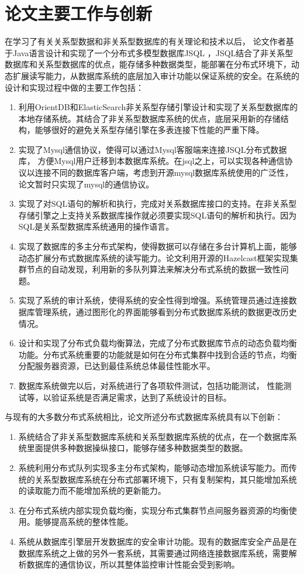 \section{论文主要工作与创新}
在学习了有关关系型数据和非关系型数据库的有关理论和技术以后，
论文作者基于Java语言设计和实现了一个分布式多模型数据库JSQL
，JSQL结合了非关系型数据库和关系型数据库的优点，能存储多种数据类型，能部署在分布式环境下，动态扩展读写能力，从数据库系统的底层加入审计功能以保证系统的安全。在系统的设计和实现过程中做的主要工作包括：
\begin{enumerate}[fullwidth,itemindent=2em]
	\item 利用OrientDB和ElasticSearch非关系型存储引擎设计和实现了关系型数据库的本地存储系统。其结合了非关系型数据库系统的优点，底层采用新的存储结构，能够很好的避免关系型存储引擎在多表连接下性能的严重下降。
	\item 实现了Mysql通信协议，使得可以通过Mysql客服端来连接JSQL分布式数据库，
	方便Mysql用户迁移到本数据库系统。在jsql之上，可以实现各种通信协议以连接不同的数据库客户端，考虑到开源mysql数据库系统使用的广泛性，论文暂时只实现了mysql的通信协议。
	\item 实现了对SQL语句的解析和执行，完成对关系数据库接口的支持。在非关系型存储引擎之上支持关系数据库操作就必须要实现SQL语句的解析和执行。因为SQL是关系型数据库系统通用的操作语言。
	\item 实现了数据库的多主分布式架构，使得数据可以存储在多台计算机上面，能够动态扩展分布式数据库系统的读写能力。论文利用开源的Hazelcast框架实现集群节点的自动发现，利用新的多队列算法来解决分布式系统的数据一致性问题。
	\item 实现了系统的审计系统，使得系统的安全性得到增强。系统管理员通过连接数据库管理系统，通过图形化的界面能够看到分布式数据库系统的数据更改历史情况。
	\item 设计和实现了分布式负载均衡算法，完成了分布式数据库节点的动态负载均衡功能。分布式系统重要的功能就是如何在分布式集群中找到合适的节点，均衡分配服务器资源，已达到最佳系统总体最佳性能水平。
	\item 数据库系统做完以后，对系统进行了各项软件测试，包括功能测试，
	性能测试等，以验证系统是否满足需求，达到了系统设计的目标。
\end{enumerate}


与现有的大多数分布式系统相比，论文所述分布式数据库系统具有以下创新：
\begin{enumerate}[fullwidth,itemindent=2em]
	\item 系统结合了非关系型数据库系统和关系型数据库系统的优点，在一个数据库系统里面提供多种数据操纵接口，能够存储多种数据类型的数据。
	\item 系统利用分布式队列实现多主分布式架构，能够动态增加系统读写能力。而传统的关系型数据库系统在分布式部署环境下，只有复制架构，其只能增加系统的读取能力而不能增加系统的更新能力。
	\item 在分布式系统内部实现负载均衡，实现分布式集群节点间服务器资源的均衡使用。能够提高系统的整体性能。
	\item 系统从数据库引擎层开发数据库的安全审计功能。现有的数据库安全产品是在数据库系统之上做的另外一套系统，其需要通过网络连接数据库系统，需要解析数据库的通信协议，所以其整体监控审计性能会受到影响。
\end{enumerate}
